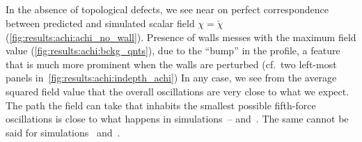 


    


    

\subsection{}
    In the absence of topological defects, we see near on perfect correspondence between predicted and simulated scalar field $\chi=\breve{\chi}$ (\cref{fig:results:achi:achi_no_wall}). Presence of walls messes with the maximum field value (\cref{fig:results:achi:bckg_qnts}), due to the ``bump'' in the profile, a feature that is much more prominent when the walls are perturbed (cf.~two left-most panels in~\cref{fig:results:achi:indepth_achi})
    In any case, we see from the average squared field value that the overall oscillations are very close to what we expect. %
    The path the field can take that inhabits the smallest possible fifth-force oscillations is close to what happens in simulations~-- and~. The same cannot be said for simulations~ and~.
    